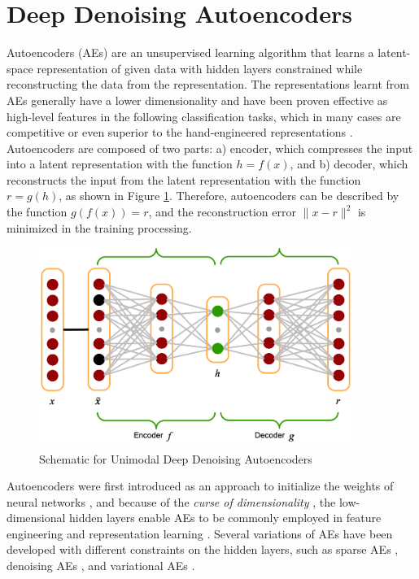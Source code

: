 \section{Deep Denoising Autoencoders}
\label{sec:DDAE}

Autoencoders (AEs) are an unsupervised learning algorithm that learns a latent-space representation of given data with hidden layers constrained while reconstructing the data from the representation. The representations learnt from AEs generally have a lower dimensionality and have been proven effective as high-level features in the following classification tasks, which in many cases are competitive or even superior to the hand-engineered representations \cite{ng2011}. Autoencoders are composed of two parts: a) encoder, which compresses the input into a latent representation with the function $h=f(x)$, and b) decoder, which reconstructs the input from the latent representation with the function $r=g(h)$, as shown in Figure \ref{fig:unimodal_ae}. Therefore, autoencoders can be described by the function $g(f(x))=r$, and the reconstruction error $\parallel x-r \parallel ^ 2$ is minimized in the training processing. 

\begin{figure}[ht]
    \centering
    \includegraphics[height=6.5cm]{images/design/autoencoder.png}
    \caption{Schematic for Unimodal Deep Denoising Autoencoders}
    \label{fig:unimodal_ae}
\end{figure}


Autoencoders were first introduced as an approach to initialize the weights of neural networks \cite{ballard1987}, and because of the \textit{curse of dimensionality} \cite{bellman1966}, the low-dimensional hidden layers enable AEs to be commonly employed in feature engineering and representation learning \cite{charte2018}. Several variations of AEs have been developed with different constraints on the hidden layers, such as sparse AEs \cite{ng2011}, denoising AEs \cite{vincent2008}, and variational AEs \cite{kingma2013}. 

